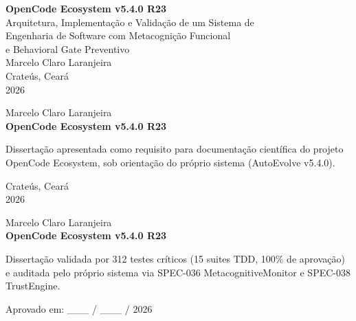 \begin{capa}
    \centering
    \vspace*{4cm}
    {\ABNTEXchapterfont\Large\bfseries OpenCode Ecosystem v5.4.0 R23}\\[1cm]
    {\ABNTEXchapterfont\large Arquitetura, Implementação e Validação de um Sistema de\\Engenharia de Software com Metacognição Funcional\\e Behavioral Gate Preventivo}\\[3cm]
    {\large Marcelo Claro Laranjeira}\\[4cm]
    {\large Crateús, Ceará\\2026}
\end{capa}

\begin{folhaderosto}
    \centering
    {\ABNTEXchapterfont\Large Marcelo Claro Laranjeira}\\[1.5cm]
    {\ABNTEXchapterfont\Large\bfseries OpenCode Ecosystem v5.4.0 R23}\\[2cm]
    \begin{flushright}
    \begin{minipage}{0.5\textwidth}
    Dissertação apresentada como requisito para documentação científica do projeto OpenCode Ecosystem, sob orientação do próprio sistema (AutoEvolve v5.4.0).
    \end{minipage}
    \end{flushright}
    \vfill
    {\large Crateús, Ceará\\2026}
\end{folhaderosto}

\begin{folhadeaprovacao}
    \centering
    {\ABNTEXchapterfont\Large Marcelo Claro Laranjeira}\\[1cm]
    {\ABNTEXchapterfont\large\bfseries OpenCode Ecosystem v5.4.0 R23}\\[2cm]
    \begin{flushright}
    \begin{minipage}{0.5\textwidth}
    Dissertação validada por 312 testes críticos (15 suites TDD, 100\% de aprovação) e auditada pelo próprio sistema via SPEC-036 MetacognitiveMonitor e SPEC-038 TrustEngine.
    \end{minipage}
    \end{flushright}
    \vspace{1cm}
    Aprovado em: \_\_\_ / \_\_\_ / 2026
\end{folhadeaprovacao}

